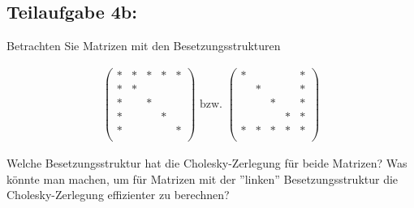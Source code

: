 \documentclass[]{article}
\begin{document}
\subsection*{Teilaufgabe 4b:}
Betrachten Sie Matrizen mit den Besetzungsstrukturen

\begin{align*}
	\begin{pmatrix}
		* & * & * & * & *\\
		* & * &   &   &  \\
		* &   & * &   &  \\
		* &   &   & * &  \\
		* &   &   &   & *\\
	\end{pmatrix}
	\text{ bzw. }
	\begin{pmatrix}
	* &   &   &   & *\\
	  & * &   &   & *\\
	  &   & * &   & *\\
	  &   &   & * & *\\
	* & * & * & * & *\\
\end{pmatrix}
\end{align*}

Welche Besetzungsstruktur hat die Cholesky-Zerlegung für beide Matrizen? Was könnte man machen, um für Matrizen mit der ''linken'' Besetzungsstruktur die Cholesky-Zerlegung effizienter zu berechnen?
\end{document}
